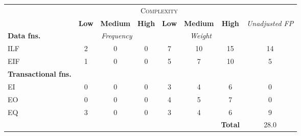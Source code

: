 
\begin{tabular}{|l|c|c|c|c|c|c|c|}
\cline{2-7}
\multicolumn{1}{c}{} & \multicolumn{6}{|c|}{\textsc{Complexity}} & \multicolumn{1}{c}{}  \\ \cline{2-8}
\multicolumn{1}{c|}{} & \textbf{Low} & \textbf{Medium} & \textbf{High} & \textbf{Low} & \textbf{Medium} & \textbf{High} & \multirow{2}{*}{\textit{Unadjusted FP}} \\ \cline{1-7}
\textbf{Data fns.} & \multicolumn{3}{|c|}{\textit{Frequency}} &  \multicolumn{3}{|c|}{\textit{Weight}} & \\ \hline
ILF 	& 2 & 0 & 0 & 7 & 10 & 15 & 14 	\\ \hline
EIF 	& 1 & 0 & 0 & 5 & 7 & 10 & 5		\\ \hline
\textbf{Transactional fns.} & \multicolumn{7}{|c|}{} \\ \hline
EI 		& 0 & 0 & 0 & 3 & 4 & 6 & 0 		\\ \hline
EO 		& 0 & 0 & 0 & 4 & 5 & 7 & 0		\\ \hline
EQ		& 3 & 0 & 0 & 3 & 4 & 6 & 9		\\ \hline
\multicolumn{6}{c|}{} & \textbf{Total} & 28.0 \\ \cline{7-8}
\end{tabular}
